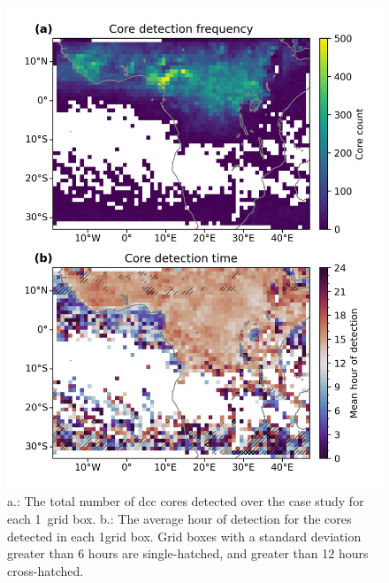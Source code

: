 \begin{figure}[tp]
    \includegraphics[width=\textwidth]{figures/chapter4_08.png}
    \caption[
    Number of detected cores and average hour of core detection
    ]{
    a.: The total number of \acrshort{dcc} cores detected over the case study for each 1\textdegree\ grid box. b.: The average hour of detection for the cores detected in each 1\textdegree grid box. Grid boxes with a standard deviation greater than 6 hours are single-hatched, and greater than 12 hours cross-hatched.
    }
    \label{fig:seviri_map_dists}
\end{figure}


